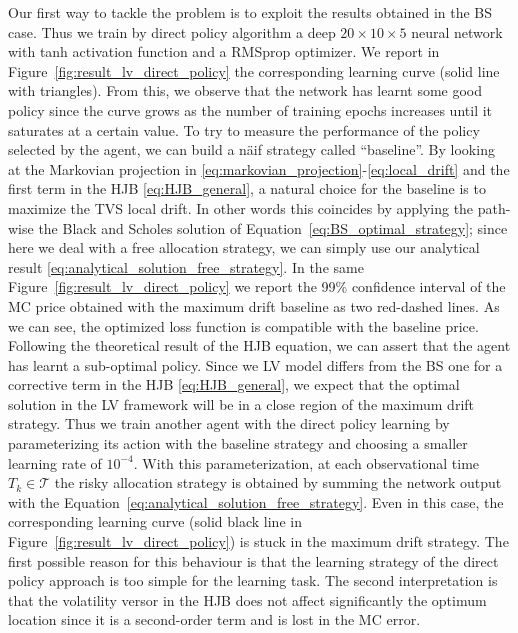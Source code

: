 \documentclass[runningheads]{m2ef}
\newcommand{\quotations}[1]{``#1''}
\begin{document}
Our first way to tackle the problem is to exploit the results obtained in the BS case. Thus we train by direct policy algorithm a deep $20\times 10\times 5$ neural network with tanh activation function and a RMSprop optimizer. We report in Figure~\ref{fig:result_lv_direct_policy} the corresponding learning curve (solid line with triangles). From this, we observe that the network has learnt some good policy since the curve grows as the number of training epochs increases until it saturates at a certain value. To try to measure the performance of the policy selected by the agent, we can build a n\"aif strategy called \quotations{baseline}. By looking at the Markovian projection in \eqref{eq:markovian_projection}-\eqref{eq:local_drift} and the first term in the HJB \eqref{eq:HJB_general}, a natural choice for the baseline is to maximize the TVS local drift. In other words this coincides by applying the path-wise the Black and Scholes solution of Equation~\eqref{eq:BS_optimal_strategy}; since here we deal with a free allocation strategy, we can simply use our analytical result \eqref{eq:analytical_solution_free_strategy}. In the same Figure~\ref{fig:result_lv_direct_policy} we report the 99\% confidence interval of the MC price obtained with the maximum drift baseline as two red-dashed lines. As we can see, the optimized loss function is compatible with the baseline price. Following the theoretical result of the HJB equation, we can assert that the agent has learnt a sub-optimal policy. Since we LV model differs from the BS one for a corrective term in the HJB \eqref{eq:HJB_general}, we expect that the optimal solution  in the LV framework will be in a close region of the maximum drift strategy. Thus we train another agent with the direct policy learning by parameterizing its action with the baseline strategy and choosing a smaller learning rate of $10^{-4}$. With this parameterization, at each observational time $T_k\in\mathcal{T}$ the risky allocation strategy is obtained by summing the network output with the Equation~\eqref{eq:analytical_solution_free_strategy}. Even in this case, the corresponding learning curve (solid black line in Figure~\ref{fig:result_lv_direct_policy}) is stuck in the maximum drift strategy. The first possible reason for this behaviour is that the learning strategy of the direct policy approach is too simple for the learning task. The second interpretation is that the volatility versor in the HJB does not affect significantly the optimum location since it is a second-order term and is lost in the MC error. 
\end{document}
